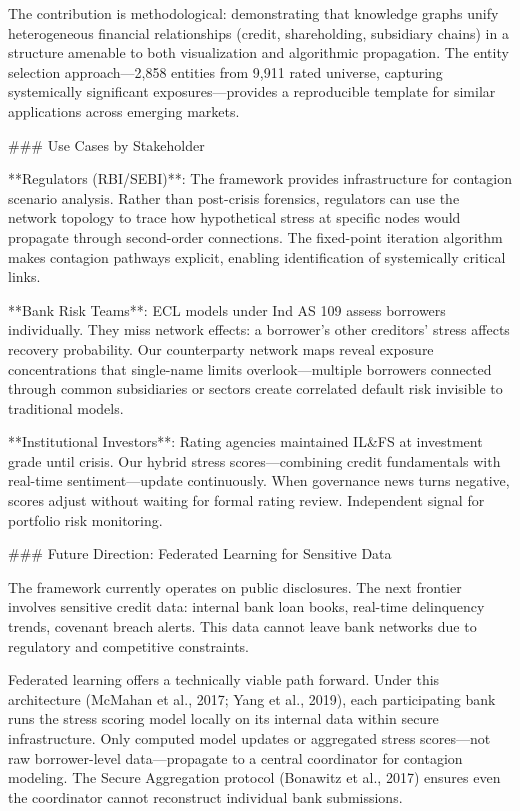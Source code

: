 \documentclass[12pt]{article}
\begin{document}
The contribution is methodological: demonstrating that knowledge graphs unify heterogeneous financial relationships (credit, shareholding, subsidiary chains) in a structure amenable to both visualization and algorithmic propagation. The entity selection approach—2,858 entities from 9,911 rated universe, capturing systemically significant exposures—provides a reproducible template for similar applications across emerging markets.

### Use Cases by Stakeholder

**Regulators (RBI/SEBI)**: The framework provides infrastructure for contagion scenario analysis. Rather than post-crisis forensics, regulators can use the network topology to trace how hypothetical stress at specific nodes would propagate through second-order connections. The fixed-point iteration algorithm makes contagion pathways explicit, enabling identification of systemically critical links.

**Bank Risk Teams**: ECL models under Ind AS 109 assess borrowers individually. They miss network effects: a borrower's other creditors' stress affects recovery probability. Our counterparty network maps reveal exposure concentrations that single-name limits overlook—multiple borrowers connected through common subsidiaries or sectors create correlated default risk invisible to traditional models.

**Institutional Investors**: Rating agencies maintained IL&FS at investment grade until crisis. Our hybrid stress scores—combining credit fundamentals with real-time sentiment—update continuously. When governance news turns negative, scores adjust without waiting for formal rating review. Independent signal for portfolio risk monitoring.

### Future Direction: Federated Learning for Sensitive Data

The framework currently operates on public disclosures. The next frontier involves sensitive credit data: internal bank loan books, real-time delinquency trends, covenant breach alerts. This data cannot leave bank networks due to regulatory and competitive constraints.

Federated learning offers a technically viable path forward. Under this architecture (McMahan et al., 2017; Yang et al., 2019), each participating bank runs the stress scoring model locally on its internal data within secure infrastructure. Only computed model updates or aggregated stress scores—not raw borrower-level data—propagate to a central coordinator for contagion modeling. The Secure Aggregation protocol (Bonawitz et al., 2017) ensures even the coordinator cannot reconstruct individual bank submissions.
\end{document}
